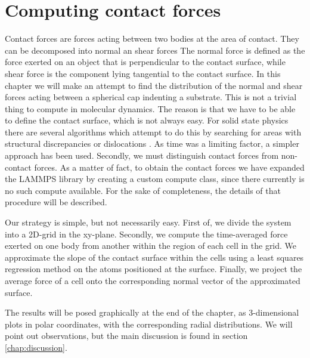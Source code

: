 \documentclass[twoside,english]{uiofysmaster}
\begin{document}
\chapter{Computing contact forces} \label{chp:contactForces}
Contact forces are forces acting between two bodies at the area of contact. 
They can be decomposed into normal an shear forces 
The normal force is defined as the force exerted on an object that is perpendicular to the contact surface, while shear force is the component lying tangential to the contact surface.
In this chapter we will make an attempt to find the distribution of the normal and shear forces acting between a spherical cap indenting a substrate. 
This is not a trivial thing to compute in molecular dynamics. 
The reason is that we have to be able to define the contact surface, which is not always easy. 
For solid state physics there are several algorithms which attempt to do this by searching for areas with structural discrepancies or dislocations \cite{stukowski}. 
As time was a limiting factor, a simpler approach has been used. 
Secondly, we must distinguish contact forces from non-contact forces. 
As a matter of fact, to obtain the contact forces we have expanded the LAMMPS library by creating a custom compute class, since there currently is no such compute available. 
For the sake of completeness, the details of that procedure will be described.

Our strategy is simple, but not necessarily easy. 
First of, we divide the system into a 2D-grid in the xy-plane. 
Secondly,  we compute the time-averaged force exerted on one body from another within the region of each cell in the grid. 
We approximate the slope of the contact surface within the cells using a least squares regression method on the atoms positioned at the surface. 
Finally, we project the average force of a cell onto the corresponding normal vector of the approximated surface.

The results will be posed graphically at the end of the chapter, as 3-dimensional plots in polar coordinates, with the corresponding radial distributions.
We will point out observations, but the main discussion is found in section \ref{chap:discussion}. 
\end{document}
